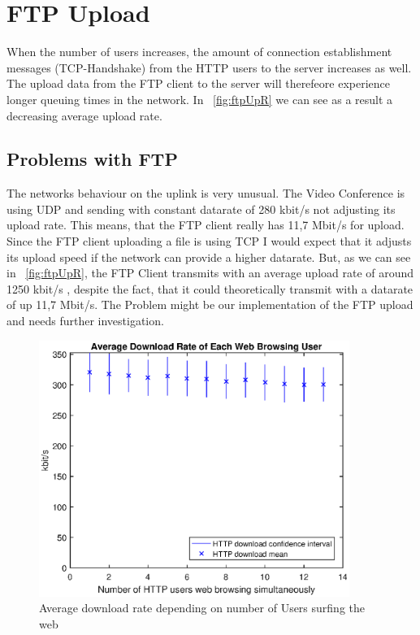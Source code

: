 \documentclass[a4paper,10pt]{book}\usepackage{graphicx}
\begin{document}
\section{FTP Upload}
When the number of users increases,  the amount of connection establishment messages (TCP-Handshake) from the HTTP 
users to the server increases as well. The upload data from the FTP client to the server will therefeore experience longer queuing times in the network.
In ~\ref{fig:ftpUpR} we can see as a result a decreasing average upload rate. 
\subsection{Problems with FTP}
\label{sec:ftp}

The networks behaviour on the uplink is very unusual. The Video Conference is using UDP and sending with constant datarate of 280 kbit/s not adjusting its upload rate. This means, that the FTP client really has 11,7 Mbit/s for upload.
Since the FTP client uploading a file is using TCP I would expect that it adjusts its upload speed if the network can provide a higher datarate.
But, as we can see in ~\ref{fig:ftpUpR}, the FTP Client transmits with an average upload rate of around 1250 kbit/s , despite the fact, that it could theoretically transmit with a datarate of up 11,7 Mbit/s.
The Problem might be our implementation of the FTP upload and needs further investigation.
\begin{figure}[!ht]
  \begin{center}
    \includegraphics[width=0.9\textwidth]{off_http_download.eps}
    \caption{Average download rate depending on number of Users surfing the web}
    \label{fig:httpDR}
  \end{center}
\end{figure}
\end{document}
